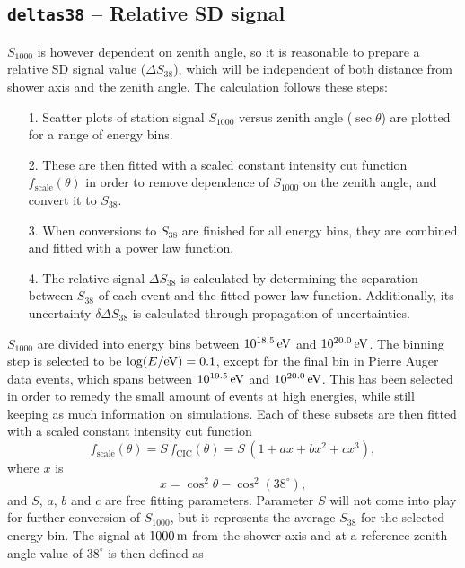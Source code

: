 \documentclass[12pt,a4paper]{report}
\begin{document}
\subsection{\texttt{deltas38} -- Relative SD signal}
$S_{1000}$ is however dependent on zenith angle, so it is reasonable to prepare a relative SD signal value ($\Delta S_{38}$), which will be independent of both distance from shower axis and the zenith angle. The calculation follows these steps:
\begin{itemize}
\item[1.] Scatter plots of station signal $S_{1000}$ versus zenith angle ($\sec \theta$) are plotted for a range of energy bins.
\item[2.] These are then fitted with a scaled constant intensity cut function $f_{\textrm{scale}}(\theta)$ in order to remove dependence of $S_{1000}$ on the zenith angle, and convert it to $S_{38}$.
\item[3.] When conversions to $S_{38}$ are finished for all energy bins, they are combined and fitted with a power law function.
\item[4.] The relative signal $\Delta S_{38}$ is calculated by determining the separation between $S_{38}$ of each event and the fitted power law function. Additionally, its uncertainty $\delta \Delta S_{38}$ is calculated through propagation of uncertainties.
\end{itemize}
$S_{1000}$ are divided into energy bins between $\unit[10^{18.5}]{eV}$ and $\unit[10^{20.0}]{eV}$. The binning step is selected to be $\log(E/\unit[]{eV}) = 0.1$, except for the final bin in Pierre Auger data events, which spans between $\unit[10^{19.5}]{eV}$ and $\unit[10^{20.0}]{eV}$. This has been selected in order to remedy the small amount of events at high energies, while still keeping as much information on simulations. Each of these subsets are then fitted with a scaled constant intensity cut function
\begin{equation}
f_{\textrm{scale}}(\theta) = S\, f_{\textrm{CIC}}(\theta) = S\, \left(1 + a x + b x^2 + c x^3\right),
\end{equation}
where $x$ is
\begin{equation}\label{eq:relativeS38}
x = \cos^2 \theta - \cos^2(38^{\circ}),
\end{equation}
and $S$, $a$, $b$ and $c$ are free fitting parameters. Parameter $S$ will not come into play for further conversion of $S_{1000}$, but it represents the average $S_{38}$ for the selected energy bin. The signal at $\unit[1000]{m}$ from the shower axis and at a reference zenith angle value of $38^{\circ}$ is then defined as
\end{document}
